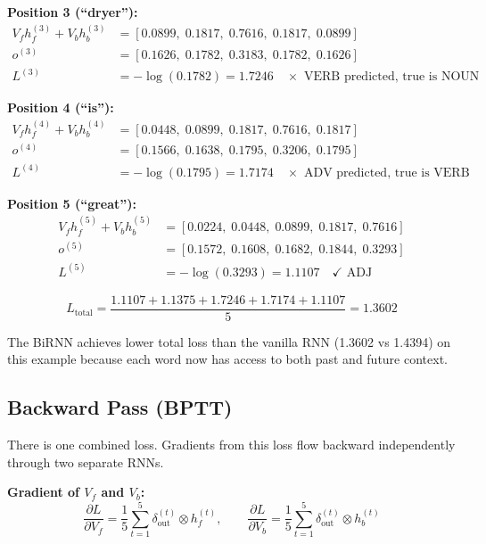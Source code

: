 \textbf{Position 3 (``dryer''):}
\begin{align*}
    V_f h_f^{(3)} + V_b h_b^{(3)} &= [0.0899,\; 0.1817,\; 0.7616,\; 0.1817,\; 0.0899] \\
    o^{(3)} &= [0.1626,\; 0.1782,\; 0.3183,\; 0.1782,\; 0.1626] \\
    L^{(3)} &= -\log(0.1782) = 1.7246 \quad \times \text{ VERB predicted, true is NOUN}
\end{align*}

\textbf{Position 4 (``is''):}
\begin{align*}
    V_f h_f^{(4)} + V_b h_b^{(4)} &= [0.0448,\; 0.0899,\; 0.1817,\; 0.7616,\; 0.1817] \\
    o^{(4)} &= [0.1566,\; 0.1638,\; 0.1795,\; 0.3206,\; 0.1795] \\
    L^{(4)} &= -\log(0.1795) = 1.7174 \quad \times \text{ ADV predicted, true is VERB}
\end{align*}

\textbf{Position 5 (``great''):}
\begin{align*}
    V_f h_f^{(5)} + V_b h_b^{(5)} &= [0.0224,\; 0.0448,\; 0.0899,\; 0.1817,\; 0.7616] \\
    o^{(5)} &= [0.1572,\; 0.1608,\; 0.1682,\; 0.1844,\; 0.3293] \\
    L^{(5)} &= -\log(0.3293) = 1.1107 \quad \checkmark \text{ ADJ}
\end{align*}

\begin{equation}
    L_{\text{total}} = \frac{1.1107 + 1.1375 + 1.7246 + 1.7174 + 1.1107}{5} = 1.3602
\end{equation}

The BiRNN achieves lower total loss than the vanilla RNN (1.3602 vs 1.4394) on this
example because each word now has access to both past and future context.

\subsection{Backward Pass (BPTT)}

There is one combined loss. Gradients from this loss flow backward independently
through two separate RNNs.

\textbf{Gradient of $V_f$ and $V_b$:}
\begin{equation}
    \frac{\partial L}{\partial V_f} = \frac{1}{5}\sum_{t=1}^{5} \delta_{\text{out}}^{(t)} \otimes h_f^{(t)}, \qquad
    \frac{\partial L}{\partial V_b} = \frac{1}{5}\sum_{t=1}^{5} \delta_{\text{out}}^{(t)} \otimes h_b^{(t)}
\end{equation}

